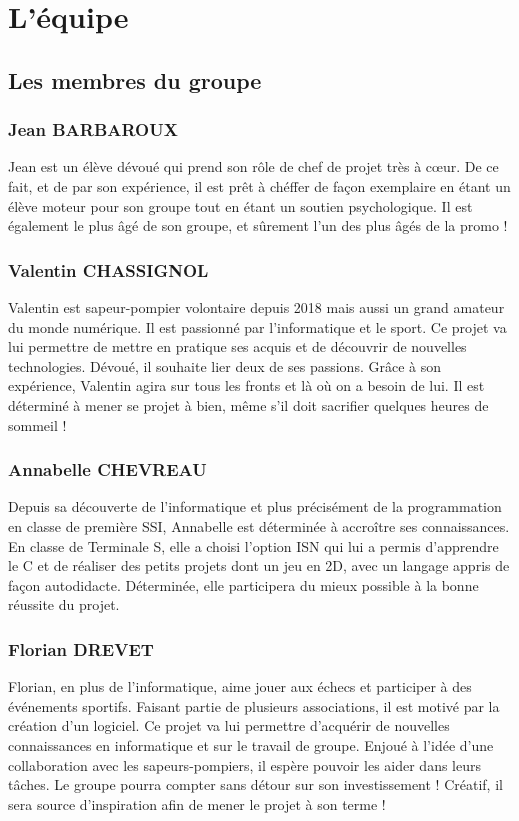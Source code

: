 \section{L'équipe}
\subsection{Les membres du groupe}

\subsubsection{Jean BARBAROUX}
Jean est un élève dévoué qui prend son rôle de chef de projet très à cœur. De ce fait, et de par son expérience, il est prêt à chéffer de façon exemplaire en étant un élève moteur pour son groupe tout en étant un soutien psychologique. Il est également le plus âgé de son groupe, et sûrement l'un des plus âgés de la promo !

\subsubsection{Valentin CHASSIGNOL}
Valentin est sapeur-pompier volontaire depuis 2018 mais aussi un grand amateur du monde numérique. Il est passionné par l'informatique et le sport. Ce projet va lui permettre de mettre en pratique ses acquis et de découvrir de nouvelles technologies. Dévoué, il souhaite lier deux de ses passions. Grâce à son expérience, Valentin agira sur tous les fronts et là où on a besoin de lui. Il est déterminé à mener se projet à bien, même s'il doit sacrifier quelques heures de sommeil !

\subsubsection{Annabelle CHEVREAU}
Depuis sa découverte de l'informatique et plus précisément de la programmation en classe de première SSI, Annabelle est déterminée à accroître ses connaissances. En classe de Terminale S, elle a choisi l'option ISN qui lui a permis d'apprendre le C et de réaliser des petits projets dont un jeu en 2D, avec un langage appris de façon autodidacte. Déterminée, elle participera du mieux possible à la bonne réussite du projet.

\subsubsection{Florian DREVET}
Florian, en plus de l'informatique, aime jouer aux échecs et participer à des événements sportifs. Faisant partie de plusieurs associations, il est motivé par la création d'un logiciel. Ce projet va lui permettre d'acquérir de nouvelles connaissances en informatique et sur le travail de groupe. Enjoué à l'idée d'une collaboration avec les sapeurs-pompiers, il espère pouvoir les aider dans leurs tâches. Le groupe pourra compter sans détour sur son investissement ! Créatif, il sera source d'inspiration afin de mener le projet à son terme !

